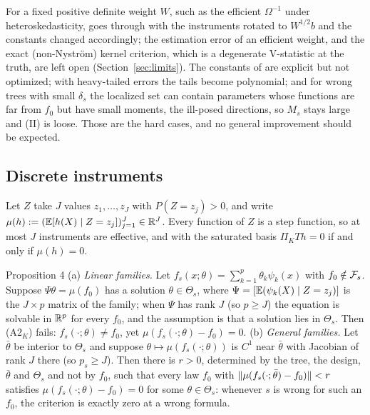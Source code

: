 For a fixed positive definite weight $W$, such as the efficient $\Omega^{-1}$ under heteroskedasticity,  goes through with the instruments rotated to $W^{1/2}b$ and the constants changed accordingly; the estimation error of an efficient weight, and the exact (non-Nystr\"om) kernel criterion, which is a degenerate V-statistic at the truth, are left open (Section~\ref{sec:limits}). The constants of  are explicit but not optimized; with heavy-tailed errors the tails become polynomial; and for wrong trees with small $\delta_s$ the localized set can contain parameters whose functions are far from $f_0$ but have small moments, the ill-posed directions, so $M_s$ stays large and (II) is loose. Those are the hard cases, and no general improvement should be expected.

\subsection{Discrete instruments}
\label{sec:discrete}

Let $Z$ take $J$ values $z_1, \dots, z_J$ with $P(Z = z_j) > 0$, and write $\mu(h) := (\mathbb{E}[h(X) \mid Z = z_j])_{j=1}^J \in \mathbb{R}^J$. Every function of $Z$ is a step function, so at most $J$ instruments are effective, and with the saturated basis $\Pi_KTh = 0$ if and only if $\mu(h) = 0$.

\begin{result}[Proposition4]{Proposition 4}
(a) \emph{Linear families.} Let $f_s(x;\theta) = \sum_{k=1}^p\theta_k\psi_k(x)$ with $f_0 \notin \mathcal{F}_s$. Suppose $\Psi\theta = \mu(f_0)$ has a solution $\theta \in \Theta_s$, where $\Psi = [\mathbb{E}(\psi_k(X) \mid Z = z_j)]$ is the $J \times p$ matrix of the family; when $\Psi$ has rank $J$ (so $p \ge J$) the equation is solvable in $\mathbb{R}^p$ for every $f_0$, and the assumption is that a solution lies in $\Theta_s$. Then (A2$_K$) fails: $f_s(\cdot;\theta) \ne f_0$, yet $\mu(f_s(\cdot;\theta) - f_0) = 0$.
(b) \emph{General families.} Let $\bar\theta$ be interior to $\Theta_s$ and suppose $\theta \mapsto \mu(f_s(\cdot;\theta))$ is $C^1$ near $\bar\theta$ with Jacobian of rank $J$ there (so $p_s \ge J$). Then there is $r > 0$, determined by the tree, the design, $\bar\theta$ and $\Theta_s$ and not by $f_0$, such that every law $f_0$ with $\lVert \mu(f_s(\cdot;\bar\theta) - f_0)\rVert < r$ satisfies $\mu(f_s(\cdot;\theta) - f_0) = 0$ for some $\theta \in \Theta_s$: whenever $s$ is wrong for such an $f_0$, the criterion is exactly zero at a wrong formula.
\end{result}

